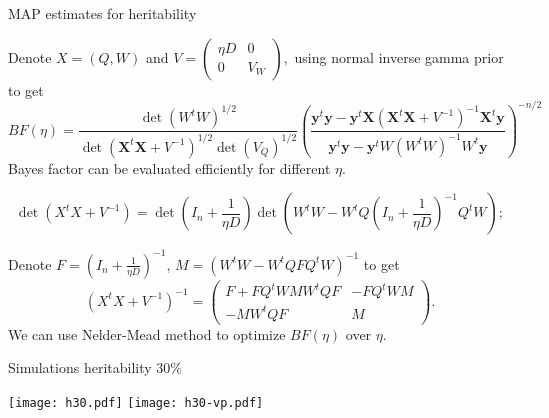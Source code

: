\documentclass[]{beamer}
\def\X{{{X}}}
\def\y{{\bf y}}
\def\X{{\mathbf{X}}}
\def\y{{\mathbf{y}}}
\begin{document}
\begin{frame}{MAP estimates for heritability}

{\small
Denote $X = (Q, W)$ and $V = \left( \begin{smallmatrix} \eta D & 0 \\  0 & V_W \end{smallmatrix} \right),$ using normal inverse gamma prior to get 
\begin{equation}
BF(\eta) = \frac{\det(W^tW)^{1/2} }{\det(\X^t \X + V^{-1})^{1/2} \det(V_Q)^{1/2}} \left( \frac{\y^t \y - \y^t \X (\X^t \X + V^{-1})^{-1} \X^t \y} {\y^t\y-\y^t W (W^t W)^{-1} W^t \y}   \right)^{-n/2} 
\end{equation}
Bayes factor can be evaluated efficiently for different $\eta$. 

$$\det(X^tX + V^{-1}) = \det(I_n+\frac{1}{\eta D}) \det(W^tW - W^t Q (I_n +\frac{1}{\eta D})^{-1} Q^t W);$$

Denote $F=(I_n+\frac{1}{\eta D})^{-1}$, $M = (W^tW - W^t Q F Q^t W)^{-1}$ to get 
%
$$(X^tX + V^{-1})^{-1} = \left( \begin{smallmatrix} F+F Q^t W M W^t Q F & -F Q^t W M \\ -M W^t Q F& M \end{smallmatrix} \right). $$
We can use Nelder-Mead method to optimize $BF(\eta)$ over $\eta$. 

}
\end{frame}


\begin{frame}{Simulations heritability $30\%$}
\begin{center}
\texttt{[image: h30.pdf]}
\texttt{[image: h30-vp.pdf]}
\end{center}
\end{frame}
\end{document}
